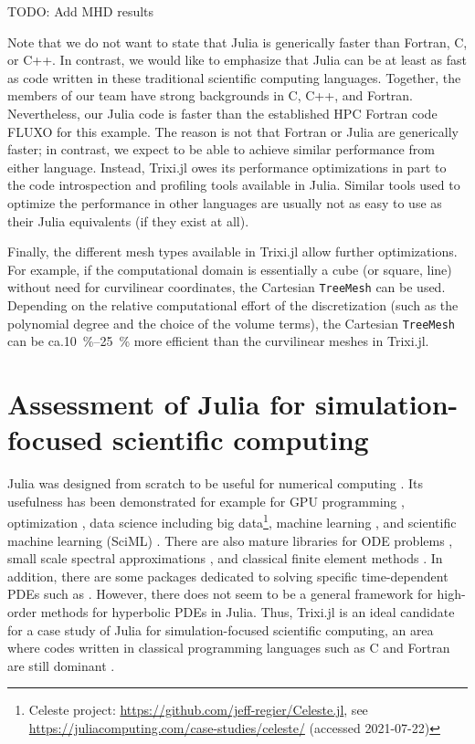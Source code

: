 \documentclass{juliacon}
\makeatletter
\newcommand{\ca}[0]{{ca.\@}\xspace}
\newcommand{\trixi}{Trixi.jl\xspace}
\newcommand{\todo}[1]{{\color{red}#1}}
\makeatother
\begin{document}
\todo{TODO: Add MHD results}

Note that we do not want to state that Julia is generically faster than Fortran,
C, or C++. In contrast, we would like to emphasize that Julia can be at least
as fast as code written in these traditional scientific computing languages.
Together, the members of our team have strong backgrounds in C, C++, and 
Fortran. Nevertheless, our Julia code is faster than the established HPC Fortran 
code FLUXO for this example. The reason is not that Fortran or Julia are generically 
faster; in contrast, we expect to be able to achieve similar performance from either 
language. Instead, \trixi owes its performance optimizations in part to the code 
introspection and profiling tools available in Julia. Similar tools used to optimize the 
performance in other languages are usually not as easy to use as their Julia 
equivalents (if they exist at all).


Finally, the different mesh types available in \trixi allow further optimizations.
For example, if the computational domain is essentially a cube (or square, line)
without need for curvilinear coordinates, the Cartesian \lstinline{TreeMesh} can
be used. Depending on the relative computational effort of the discretization
(such as the polynomial degree and the choice of the volume terms), the
Cartesian \lstinline{TreeMesh} can be \ca \SI{10}{\percent}--\SI{25}{\percent}
more efficient than the curvilinear meshes in \trixi.



\section{Assessment of Julia for simulation-focused scientific computing}
\label{sec:assessment-of-julia}

Julia was designed from scratch to be useful for numerical computing
\cite{bezanson2017julia}. Its usefulness has been demonstrated for example for
GPU programming \cite{besard2018juliagpu, omlin2020solving},
optimization \cite{dunning2017jump}, data science including
big data\footnote{Celeste project: \url{https://github.com/jeff-regier/Celeste.jl},
see \url{https://juliacomputing.com/case-studies/celeste/} (accessed 2021-07-22)},
machine learning \cite{innes2018fashionable}, and scientific machine learning
(SciML) \cite{pal2021opening}. There are also mature libraries for ODE problems
\cite{rackauckas2017differentialequations}, small scale spectral approximations
\cite{olver2014practical}, and classical finite element methods \cite{badia2020gridap}.
In addition, there are some packages dedicated to solving specific time-dependent
PDEs such as \cite{ramadhan2020oceananigans, constantinou2021geophysicalflows}.
However, there does not seem to be a general framework for high-order methods
for hyperbolic PDEs in Julia. Thus, \trixi is an ideal candidate for a case study
of Julia for simulation-focused scientific computing, an area where codes written
in classical programming languages such as C and Fortran are still dominant
\cite{krais2021flexi, parsani2021ssdc}.
\end{document}
